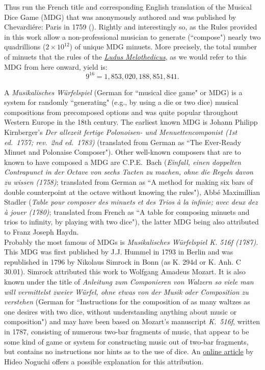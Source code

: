 \documentclass[a4paper,x11names,svgnames,10pt]{article}
\begin{document}
{Thus run the French title and corresponding English translation of the Musical Dice Game (MDG) that was anonymously authored and was published by Chevardi\'{e}re: Paris in 1759 (\citealp{ludus1759}).  Rightly and interestingly so, as the Rules provided in this work allow a non-professional musician to generate (``compose") nearly two quadrillions ($2 \times 10^{12}$) of unique MDG minuets.  More precisely, the total number of minuets that the rules of the \href{https://imslp.org/wiki/Ludus_Melothedicus_(Anonymous)}{{\em Ludus Melothedicus}}, as we would refer to this MDG from here onward, yield is: $$9^{16} = 1\!,853\!,020\!,188\!,851\!,841.$$ 

\noindent A {\it Musikalisches W\"{u}rfelspiel} (German for ``musical dice game" or MDG) is a system for randomly ``generating" (e.g., by using a die or two dice) musical compositions from precomposed options and was quite popular throughout Western Europe in the 18th century.  The earliest known MDG is Johann Philipp Kirnberger's {\em Der allezeit fertige Polonoisen- und Menuettencomponist (1st ed.\ 1757; rev.\ 2nd ed.\ 1783)} (translated from German as ``The Ever-Ready Minuet and Polonaise Composer").  Other well-known composers that are to known to have composed a MDG are C.P.E.\ Bach ({\em Einfall, einen doppelten Contrapunct in der Octave von sechs Tacten zu machen, ohne die Regeln davon zu wissen (1758)}; translated from German as ``A method for making six bars of double counterpoint at the octave without knowing the rules"), Abb\'{e} Maximillian Stadler ({\em Table pour composer des minuets et des Trios \`{a} la infinie; avec deux dez \`{a} jouer (1780)}; translated from French as ``A table for composing minuets and trios to infinity, by playing with two dice"), the latter MDG being also attributed to Franz Joseph Haydn.\\

Probably the most famous of MDGs is {\it Musikalisches W\"{u}rfelspiel K. 516f (1787)}.  This MDG was first published by J.J. Hummel in 1793 in Berlin and was republished in 1796 by Nikolaus Simrock in Bonn (as K. 294d or K. Anh. C 30.01). Simrock attributed this work to Wolfgang Amadeus Mozart. It is also known under the title of {\em Anleitung zum Componieren von Walzern so viele man will vermittelst zweier W\"{u}rfel, ohne etwas von der Musik oder Composition zu verstehen} (German for ``Instructions for the composition of as many waltzes as one desires with two dice, without understanding anything about music or composition") and may have been based on Mozart's manuscript {\em K.\ 516f}, written in 1787, consisting of numerous two-bar fragments of music, that appear to be some kind of game or system for constructing music out of two-bar fragments, but contains no instructions nor hints as to the use of dice.  An \href{(http://www.asahi-net.or.jp/\~rb5h-ngc/e/k516f.htm}{online article} by Hideo Noguchi offers a possible explanation for this attribution.\\

}
\end{document}
